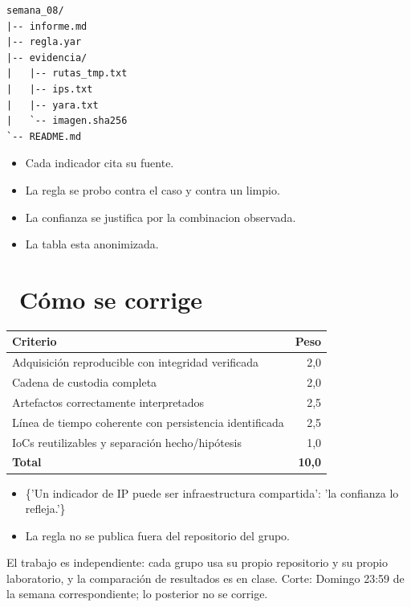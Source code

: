 \documentclass[11pt,a4paper]{article}
\newcommand{\iconotexto}[2]{\textcolor{cyanNeon}{\faIcon{#1}}~#2}
\begin{document}
\begin{lstlisting}[style=estiloCodigo]
semana_08/
|-- informe.md
|-- regla.yar
|-- evidencia/
|   |-- rutas_tmp.txt
|   |-- ips.txt
|   |-- yara.txt
|   `-- imagen.sha256
`-- README.md
\end{lstlisting}

\begin{itemize}[leftmargin=1.4em,itemsep=2pt,topsep=3pt]
  \item Cada indicador cita su fuente.
  \item La regla se probo contra el caso y contra un limpio.
  \item La confianza se justifica por la combinacion observada.
  \item La tabla esta anonimizada.
\end{itemize}

\section{\iconotexto{ruler-combined}{Cómo se corrige}}

\begin{tabularx}{\linewidth}{@{}X r@{}}
\toprule
Criterio & Peso\\
\midrule
Adquisición reproducible con integridad verificada & 2,0 \\
Cadena de custodia completa & 2,0 \\
Artefactos correctamente interpretados & 2,5 \\
Línea de tiempo coherente con persistencia identificada & 2,5 \\
IoCs reutilizables y separación hecho/hipótesis & 1,0 \\
\midrule
\textbf{Total} & \textbf{10,0}\\
\bottomrule
\end{tabularx}

\begin{itemize}[leftmargin=1.4em,itemsep=2pt,topsep=3pt]
  \item \{'Un indicador de IP puede ser infraestructura compartida': 'la confianza lo refleja.'\}
  \item La regla no se publica fuera del repositorio del grupo.
\end{itemize}

\begin{cajaRecuerda}El trabajo es independiente: cada grupo usa su propio repositorio y su propio laboratorio, y la comparación de resultados es en clase. Corte: Domingo 23:59 de la semana correspondiente; lo posterior no se corrige.
\end{cajaRecuerda}
\end{document}
